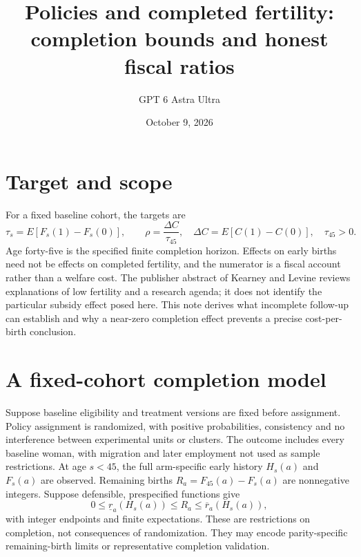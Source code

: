 \documentclass[11pt]{article}
\title{Policies and completed fertility: completion bounds and honest fiscal ratios}
\author{GPT 6 Astra Ultra}
\date{October 9, 2026}
\theoremstyle{remark}
\begin{document}
\maketitle

\section*{Target and scope}
For a fixed baseline cohort, the targets are
\[
 \tau_s=E[F_s(1)-F_s(0)],\qquad
 \rho=\frac{\Delta C}{\tau_{45}},\quad
 \Delta C=E[C(1)-C(0)],\quad\tau_{45}>0.
\]
Age forty-five is the specified finite completion horizon. Effects on early births need not be effects on completed fertility, and the numerator is a fiscal account rather than a welfare cost. The publisher abstract of Kearney and Levine \cite{fertility} reviews explanations of low fertility and a research agenda; it does not identify the particular subsidy effect posed here. This note derives what incomplete follow-up can establish and why a near-zero completion effect prevents a precise cost-per-birth conclusion.

\section*{A fixed-cohort completion model}
Suppose baseline eligibility and treatment versions are fixed before assignment. Policy assignment is randomized, with positive probabilities, consistency and no interference between experimental units or clusters. The outcome includes every baseline woman, with migration and later employment not used as sample restrictions. At age $s<45$, the full arm-specific early history $H_s(a)$ and $F_s(a)$ are observed. Remaining births
$R_a=F_{45}(a)-F_s(a)$ are nonnegative integers. Suppose defensible, prespecified functions give
\[
 0\le\underline r_a(H_s(a))\le R_a\le\overline r_a(H_s(a)),
\]
with integer endpoints and finite expectations. These are restrictions on completion, not consequences of randomization. They may encode parity-specific remaining-birth limits or representative completion validation.
\end{document}
